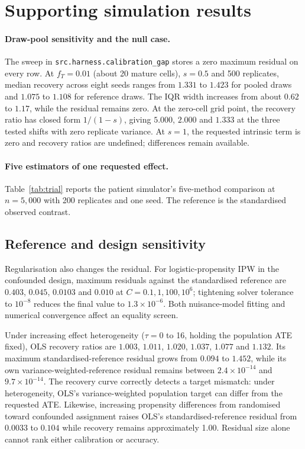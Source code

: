 \appendix



\section{Supporting simulation results}
\label{app:generator}

\paragraph{Draw-pool sensitivity and the null case.}
The sweep in \texttt{src.harness.calibration\_gap} stores a zero maximum
residual on every row. At $f_T=0.01$ (about 20
mature cells), $s=0.5$ and 500 replicates, median recovery across eight seeds
ranges from $1.331$ to $1.423$ for pooled draws and $1.075$ to $1.108$ for
reference draws. The IQR width increases from about $0.62$ to $1.17$, while
the residual remains zero. At the zero-cell grid point, the recovery ratio has
closed form $1/(1-s)$, giving $5.000$, $2.000$ and $1.333$ at the three tested
shifts with zero replicate variance. At $s=1$, the requested intrinsic term is
zero and recovery ratios are undefined; differences remain available.

\paragraph{Five estimators of one requested effect.}
Table~\ref{tab:trial} reports the patient simulator's five-method comparison
at $n=5{,}000$ with 200 replicates and one seed. The reference is the standardised observed contrast.


\subsection{Reference and design sensitivity}
\label{app:matrix}


Regularisation also changes the residual. For logistic-propensity IPW in the
confounded design, maximum residuals against the standardised reference are
$0.403$, $0.045$, $0.0103$ and $0.010$ at $C=0.1,1,100,10^6$; tightening
solver tolerance to $10^{-8}$ reduces the final value to $1.3\times10^{-6}$.
Both nuisance-model fitting and numerical convergence affect an equality screen.

Under increasing effect heterogeneity ($\tau=0$ to 16, holding the population
ATE fixed), OLS recovery ratios are $1.003$, $1.011$, $1.020$, $1.037$,
$1.077$ and $1.132$. Its maximum standardised-reference residual grows from
$0.094$ to $1.452$, while its own variance-weighted-reference residual remains
between $2.4\times10^{-14}$ and $9.7\times10^{-14}$. The recovery curve
correctly detects a target mismatch: under heterogeneity, OLS's
variance-weighted population target can differ from the requested ATE.
Likewise, increasing propensity differences from randomised toward confounded
assignment raises OLS's standardised-reference residual from $0.0033$ to
$0.104$ while recovery remains approximately 1.00. Residual size alone cannot
rank either calibration or accuracy.

